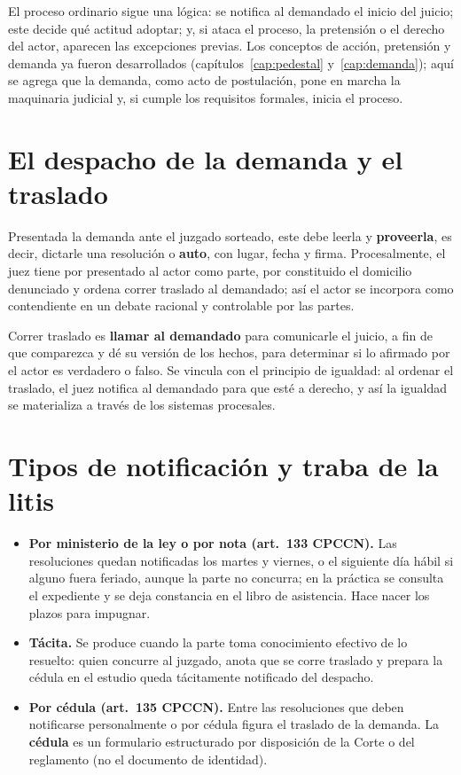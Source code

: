 \documentclass[12pt,oneside]{book}
\begin{document}
El proceso ordinario sigue una lógica: se notifica al demandado el inicio del juicio; este decide qué actitud adoptar; y, si ataca el proceso, la pretensión o el derecho del actor, aparecen las excepciones previas. Los conceptos de acción, pretensión y demanda ya fueron desarrollados (capítulos~\ref{cap:pedestal} y~\ref{cap:demanda}); aquí se agrega que la demanda, como acto de postulación, pone en marcha la maquinaria judicial y, si cumple los requisitos formales, inicia el proceso.

\section{El despacho de la demanda y el traslado}

Presentada la demanda ante el juzgado sorteado, este debe leerla y \textbf{proveerla}, es decir, dictarle una resolución o \textbf{auto}, con lugar, fecha y firma. Procesalmente, el juez tiene por presentado al actor como parte, por constituido el domicilio denunciado y ordena correr traslado al demandado; así el actor se incorpora como contendiente en un debate racional y controlable por las partes.

Correr traslado es \textbf{llamar al demandado} para comunicarle el juicio, a fin de que comparezca y dé su versión de los hechos, para determinar si lo afirmado por el actor es verdadero o falso. Se vincula con el principio de igualdad: al ordenar el traslado, el juez notifica al demandado para que esté a derecho, y así la igualdad se materializa a través de los sistemas procesales.

\section{Tipos de notificación y traba de la litis}

\begin{itemize}
\item \textbf{Por ministerio de la ley o por nota (art.~133 CPCCN).} Las resoluciones quedan notificadas los martes y viernes, o el siguiente día hábil si alguno fuera feriado, aunque la parte no concurra; en la práctica se consulta el expediente y se deja constancia en el libro de asistencia. Hace nacer los plazos para impugnar.
\item \textbf{Tácita.} Se produce cuando la parte toma conocimiento efectivo de lo resuelto: quien concurre al juzgado, anota que se corre traslado y prepara la cédula en el estudio queda tácitamente notificado del despacho.
\item \textbf{Por cédula (art.~135 CPCCN).} Entre las resoluciones que deben notificarse personalmente o por cédula figura el traslado de la demanda. La \textbf{cédula} es un formulario estructurado por disposición de la Corte o del reglamento (no el documento de identidad).
\end{itemize}
\end{document}
